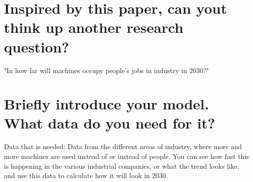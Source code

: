 \documentclass{article}
\begin{document}
\section{Inspired by this paper, can yout think up another research question? }
"In how far will machines occupy people's jobs in industry in 2030?"

\section{Briefly introduce your model. What data do you need for it?}

Data that is needed: Data from the different areas of industry, where more and more machines are used instead of or instead of people. You can see how fast this is happening in the various industrial companies, or what the trend looks like, and use this data to calculate how it will look in 2030.
\end{document}
